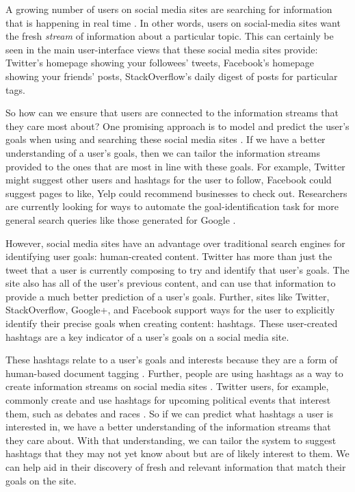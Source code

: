 \documentclass[man,floatsintext,donotrepeattitle]{apa6}
\begin{document}
A growing number of users on social media sites are searching for information that is happening in real time \parencite{Jansen2011}.
In other words, users on social-media sites want the fresh \emph{stream} of information about a particular topic.
This can certainly be seen in the main user-interface views that these social media sites provide:
Twitter's homepage showing your followees' tweets, Facebook's homepage showing your friends' posts, StackOverflow's daily digest of posts for particular tags.

So how can we ensure that users are connected to the information streams that they care most about?
One promising approach is to model and predict the user's goals when using and searching these social media sites \parencite{Rose2004}.
If we have a better understanding of a user's goals, then we can tailor the information streams provided to the ones that are most in line with these goals.
For example, Twitter might suggest other users and hashtags for the user to follow, Facebook could suggest pages to like, Yelp could recommend businesses to check out.
Researchers are currently looking for ways to automate the goal-identification task for more general search queries like those generated for Google \parencites{Jansen2008}{Lee2005}.

However, social media sites have an advantage over traditional search engines for identifying user goals: human-created content.
Twitter has more than just the tweet that a user is currently composing to try and identify that user's goals.
The site also has all of the user's previous content, and can use that information to provide a much better prediction of a user's goals.
Further, sites like Twitter, StackOverflow, Google+, and Facebook support ways for the user to explicitly identify their precise goals when creating content: hashtags.
These user-created hashtags are a key indicator of a user's goals on a social media site. 

These hashtags relate to a user's goals and interests because they are a form of human-based document tagging \parencite{Chang2010}.
Further, people are using hashtags as a way to create information streams on social media sites \parencite{Kwak2010}.
Twitter users, for example, commonly create and use hashtags for upcoming political events that interest them, such as debates and races \parencite{Diakopoulos2010}.
So if we can predict what hashtags a user is interested in, we have a better understanding of the information streams that they care about.
With that understanding, we can tailor the system to suggest hashtags that they may not yet know about but are of likely interest to them.
We can help aid in their discovery of fresh and relevant information that match their goals on the site.
\end{document}
